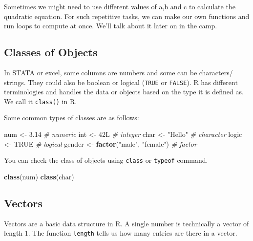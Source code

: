 \documentclass[
]{article}
\newenvironment{Shaded}{\begin{snugshade}}{\end{snugshade}}
\newcommand{\CommentTok}[1]{\textcolor[rgb]{0.56,0.35,0.01}{\textit{#1}}}
\newcommand{\ConstantTok}[1]{\textcolor[rgb]{0.56,0.35,0.01}{#1}}
\newcommand{\DataTypeTok}[1]{\textcolor[rgb]{0.13,0.29,0.53}{#1}}
\newcommand{\DecValTok}[1]{\textcolor[rgb]{0.00,0.00,0.81}{#1}}
\newcommand{\FloatTok}[1]{\textcolor[rgb]{0.00,0.00,0.81}{#1}}
\newcommand{\FunctionTok}[1]{\textcolor[rgb]{0.13,0.29,0.53}{\textbf{#1}}}
\newcommand{\NormalTok}[1]{#1}
\newcommand{\OtherTok}[1]{\textcolor[rgb]{0.56,0.35,0.01}{#1}}
\newcommand{\StringTok}[1]{\textcolor[rgb]{0.31,0.60,0.02}{#1}}
\begin{document}
Sometimes we might need to use different values of a,b and c to
calculate the quadratic equation. For such repetitive tasks, we can make
our own functions and run loops to compute at once. We'll talk about it
later on in the camp.

\subsection{Classes of Objects}\label{classes-of-objects}

In STATA or excel, some columns are numbers and some can be characters/
strings. They could also be boolean or logical (\texttt{TRUE} or
\texttt{FALSE}). R has different terminologies and handles the data or
objects based on the type it is defined as. We call it \texttt{class()}
in R.

Some common types of classes are as follows:

\begin{Shaded}
\begin{Highlighting}[]
\NormalTok{num }\OtherTok{\textless{}{-}} \FloatTok{3.14}       \CommentTok{\# numeric}
\NormalTok{int }\OtherTok{\textless{}{-}} \DecValTok{42}\DataTypeTok{L}        \CommentTok{\# integer}
\NormalTok{char }\OtherTok{\textless{}{-}} \StringTok{"Hello"}   \CommentTok{\# character}
\NormalTok{logic }\OtherTok{\textless{}{-}} \ConstantTok{TRUE}     \CommentTok{\# logical}
\NormalTok{gender }\OtherTok{\textless{}{-}} \FunctionTok{factor}\NormalTok{(}\StringTok{"male"}\NormalTok{, }\StringTok{"female"}\NormalTok{) }\CommentTok{\# factor}
\end{Highlighting}
\end{Shaded}

You can check the class of objects using \texttt{class} or
\texttt{typeof} command.

\begin{Shaded}
\begin{Highlighting}[]
\FunctionTok{class}\NormalTok{(num)}
\FunctionTok{class}\NormalTok{(char)}
\end{Highlighting}
\end{Shaded}

\subsection{Vectors}\label{vectors}

Vectors are a basic data structure in R. A single number is technically
a vector of length 1. The function \texttt{length} tells us how many
entries are there in a vector.
\end{document}
